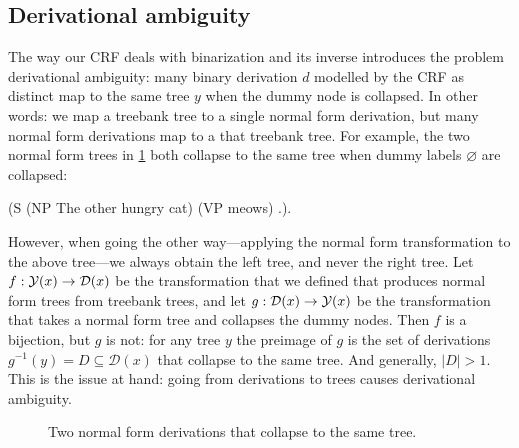   \subsection{Derivational ambiguity}
    The way our CRF deals with binarization and its inverse introduces the problem derivational ambiguity: many binary derivation $d$ modelled by the CRF as distinct map to the same tree $y$ when the dummy node is collapsed. In other words: we map a treebank tree to a single normal form derivation, but many normal form derivations map to a that treebank tree. For example, the two normal form trees in \ref{fig:normal-form-trees} both collapse to the same tree when dummy labels $\varnothing$ are collapsed:
    \begin{center}
      (S (NP The other hungry cat) (VP meows) .).
    \end{center}
    However, when going the other way---applying the normal form transformation to the above tree---we always obtain the left tree, and never the right tree. Let $f: \yieldx \to \mathcal{D}(x)$ be the transformation that we defined that produces normal form trees from treebank trees, and let $g: \mathcal{D}(x) \to \yieldx$ be the transformation that takes a normal form tree and collapses the dummy nodes. Then $f$ is a bijection, but $g$ is not: for any tree $y$ the preimage of $g$ is the set of derivations $g^{-1}( y ) = D \subseteq \mathcal{D}(x)$ that collapse to the same tree. And generally, $\lvert D \rvert > 1$. This is the issue at hand: going from derivations to trees causes derivational ambiguity.

    \begin{figure}[h]
      \begin{subfigure}[b]{0.5\textwidth}
        \center
        \begin{tikzpicture}[scale=.8]
          
        \end{tikzpicture}
    	\end{subfigure}
    	\begin{subfigure}[b]{0.5\textwidth}
        \center
        \begin{tikzpicture}[scale=.8]
          
        \end{tikzpicture}
    	\end{subfigure}
      \caption{Two normal form derivations that collapse to the same tree.}
      \label{fig:normal-form-trees}
    \end{figure}

